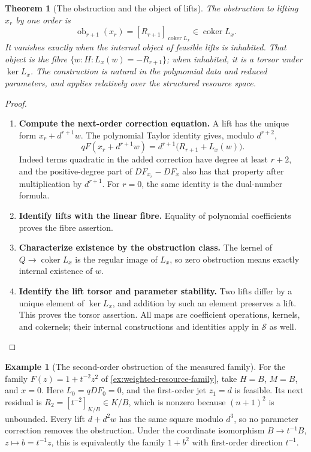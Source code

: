 \documentclass[11pt,a4paper]{article}
\numberwithin{algorithm}{section}
\numberwithin{equation}{section}
\newtheorem{theorem}{Theorem}[section]
\theoremstyle{definition}
\newtheorem{example}[example]{Example}
\theoremstyle{remark}
\theoremstyle{plain}
\theoremstyle{definition}
\theoremstyle{plain}
\begin{document}
\begin{theorem}[The obstruction and the object of lifts]
\label{thm:feasibility-obstructions}
The obstruction to lifting $x_r$ by one order is
\begin{equation}\label{eq:feasibility-obstruction}
 \operatorname{ob}_{r+1}(x_r)
       =[R_{r+1}]_{\operatorname{coker}L_x}\in\operatorname{coker}L_x.
\end{equation}
It vanishes exactly when the internal object of feasible lifts
is inhabited. That object is the fibre
$\{w:H:L_x(w)=-R_{r+1}\}$; when inhabited, it is a torsor
under $\ker L_x$. The construction is natural in the polynomial
data and reduced parameters, and applies relatively over
the structured resource space.
\end{theorem}
\begin{proof}\leavevmode
\begin{enumerate}[leftmargin=*,align=left]
\item \textbf{Compute the next-order correction equation.}
A lift has the unique form $x_r+d^{r+1}w$.
The polynomial Taylor identity gives, modulo $d^{r+2}$,
\[
 qF(x_r+d^{r+1}w)
   =d^{r+1}\bigl(R_{r+1}+L_x(w)\bigr).
\]
Indeed terms quadratic in the added correction have degree
at least $r+2$, and the positive-degree part of $DF_{x_r}-DF_x$
also has that property after multiplication by $d^{r+1}$.
For $r=0$, the same identity is the dual-number formula.

\item \textbf{Identify lifts with the linear fibre.}
Equality of polynomial coefficients proves the fibre assertion.

\item \textbf{Characterize existence by the obstruction class.}
The kernel of $Q\to\operatorname{coker}L_x$ is the regular
image of $L_x$, so zero obstruction means exactly internal
existence of $w$.

\item \textbf{Identify the lift torsor and parameter stability.}
Two lifts differ by a unique element of
$\ker L_x$, and addition by such an element preserves a lift.
This proves the torsor assertion.
All maps are coefficient operations, kernels, and cokernels;
their internal constructions and identities apply in
$\mathscr S$ as well.
\end{enumerate}
\end{proof}


\begin{example}[The second-order obstruction of the measured family]
\label{ex:second-obstruction}
For the family $F(z)=1+t^{-2}z^2$ of
\cref{ex:weighted-resource-family}, take $H=B$, $M=B$, and $x=0$.
Here $L_0=qDF_0=0$, and the first-order jet $z_1=d$ is feasible.
Its next residual is $R_2=[t^{-2}]_{K/B}\in K/B$, which is nonzero because
$(n+1)^2$ is unbounded. Every lift $d+d^2w$ has the same square
modulo $d^3$, so no parameter correction removes the obstruction.
Under the coordinate isomorphism $B\to t^{-1}B$,
$z\mapsto b=t^{-1}z$, this is equivalently the family
$1+b^2$ with first-order direction $t^{-1}$.
\end{example}
\end{document}
